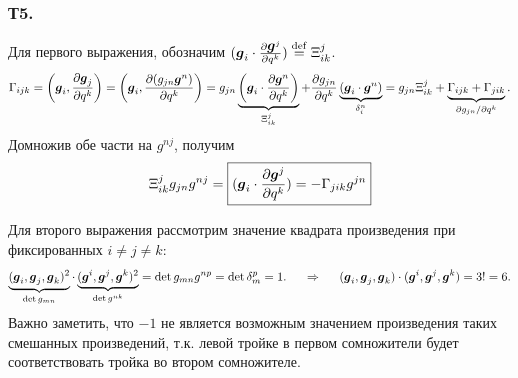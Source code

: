 \subsubsection*{Т5.}
Для первого выражения, обозначим $(\mbox{\boldmath $g$}_i \cdot \frac{\partial \mbox{\boldmath $g$}^j}{\partial q^k}) \overset{\mathrm{def}}{=} \Xi_{ik}^j$. 
$$
    \Gamma_{ijk} = \left(\mbox{\boldmath $g$}_i, \frac{\partial \mbox{\boldmath $g$}_j}{\partial q^k}\right) 
    = \left(\mbox{\boldmath $g$}_i, \frac{\partial (g_{jn}\mbox{\boldmath $g$}^n)}{\partial q^k}\right) =
    g_{jn}\underbrace{\left(\mbox{\boldmath $g$}_i \cdot \frac{\partial \mbox{\boldmath $g$}^n}{\partial q^k} \right)}_{\Xi_{ik}^j} +
    \frac{\partial g_{jn}}{\partial q^k} \underbrace{\left(\mbox{\boldmath $g$}_i \cdot \mbox{\boldmath $g$}^n\right)}_{\delta_i^n} = g_{jn} \Xi_{ik}^j + \underbrace{\Gamma_{ijk} + \Gamma_{jik}}_{\partial g_{jn} / \partial q^k}.
$$
Домножив обе части на $g^{nj}$, получим
$$
    \Xi_{ik}^j g_{jn} g^{nj} = \boxed{(\mbox{\boldmath $g$}_i \cdot \frac{\partial \mbox{\boldmath $g$}^j}{\partial q^k}) = - \Gamma_{jik} g^{jn}}
$$



Для второго выражения рассмотрим значение квадрата произведения при фиксированных $i \neq j \neq k$:
$$
    \underbrace{(\mbox{\boldmath $g$}_i, \mbox{\boldmath $g$}_j, \mbox{\boldmath $g$}_k)^2}_{\det g_{mn}} \cdot 
    \underbrace{(\mbox{\boldmath $g$}^i, \mbox{\boldmath $g$}^j, \mbox{\boldmath $g$}^k)^2}_{\det g^{nk}} = \det g_{mn} g^{np} = \det \delta_m^p = 1.
    \hspace{0.5cm} \Rightarrow \hspace{0.5cm} 
    (\mbox{\boldmath $g$}_i, \mbox{\boldmath $g$}_j, \mbox{\boldmath $g$}_k) \cdot (\mbox{\boldmath $g$}^i, \mbox{\boldmath $g$}^j, \mbox{\boldmath $g$}^k) = 3! = 6.
$$
Важно заметить, что $-1$ не является возможным значением произведения таких смешанных произведений, т.к. левой тройке в первом сомножители будет соответствовать тройка во втором сомножителе.
